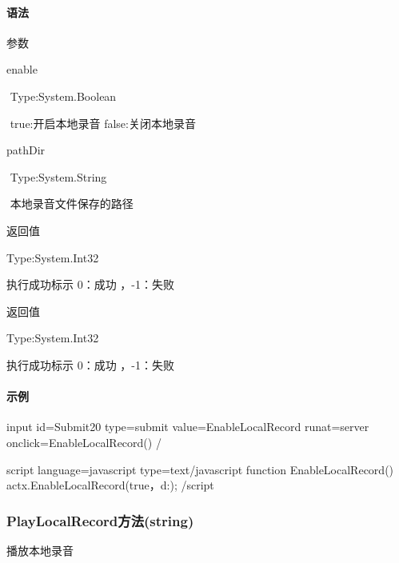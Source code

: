 \documentclass[letterpaper,10pt,english]{sphinxmanual}
\begin{document}
\paragraph{语法}
\label{\detokenize{csharp_activex:id154}}
%
\begin{sphinxVerbatim}[commandchars=\\\{\}]
     
\end{sphinxVerbatim}

参数

enable

​ Type:System.Boolean

​ true:开启本地录音 false:关闭本地录音

pathDir

​ Type:System.String

​ 本地录音文件保存的路径

返回值

Type:System.Int32

执行成功标示 0：成功 ，-1：失败

返回值

Type:System.Int32

执行成功标示 0：成功 ，-1：失败


\paragraph{示例}
\label{\detokenize{csharp_activex:id155}}
%
\begin{sphinxVerbatim}[commandchars=\\\{\}]
 \PYGZlt{}input id=\PYGZdq{}Submit20\PYGZdq{} type=\PYGZdq{}submit\PYGZdq{} value=\PYGZsq{}EnableLocalRecord\PYGZsq{} runat=\PYGZdq{}server\PYGZdq{}  onclick=\PYGZdq{}EnableLocalRecord()\PYGZdq{} /\PYGZgt{}

\PYGZlt{}script language=\PYGZdq{}javascript\PYGZdq{} type=\PYGZdq{}text/javascript\PYGZdq{}\PYGZgt{}
    function EnableLocalRecord() \PYGZob{}
        actx.EnableLocalRecord(true，\PYGZdq{}d:\PYGZbs{}\PYGZdq{});
    \PYGZcb{}
\PYGZlt{}/script\PYGZgt{}
\end{sphinxVerbatim}


\subsubsection{PlayLocalRecord方法(string)}
\label{\detokenize{csharp_activex:playlocalrecord-string}}
播放本地录音
\end{document}
